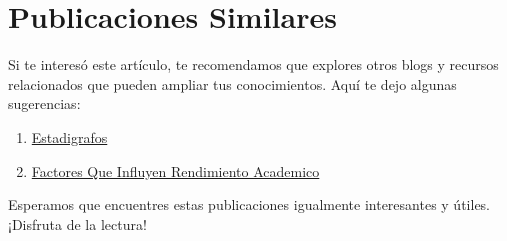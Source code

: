 \documentclass[
  jou,
  floatsintext,
  longtable,
  a4paper,
  nolmodern,
  notxfonts,
  notimes,
  12pt,
  colorlinks=true,linkcolor=blue,citecolor=blue,urlcolor=blue]{apa7}
\providecommand{\tightlist}{%
  \setlength{\itemsep}{0pt}\setlength{\parskip}{0pt}}
\begin{document}
\begin{ThreePartTable}
\end{ThreePartTable}

\section{Publicaciones Similares}\label{publicaciones-similares}

Si te interesó este artículo, te recomendamos que explores otros blogs y
recursos relacionados que pueden ampliar tus conocimientos. Aquí te dejo
algunas sugerencias:

\begin{enumerate}
\def\labelenumi{\arabic{enumi}.}
\tightlist
\item
  \href{https://epsilon-y-beta.netlify.app/estadistica/2018-05-16-estadigrafos/index.pdf}{}
  \href{https://epsilon-y-beta.netlify.app/estadistica/2018-05-16-estadigrafos}{Estadigrafos}
\item
  \href{https://epsilon-y-beta.netlify.app/estadistica/2018-12-26-factores-que-influyen-rendimiento-academico/index.pdf}{}
  \href{https://epsilon-y-beta.netlify.app/estadistica/2018-12-26-factores-que-influyen-rendimiento-academico}{Factores
  Que Influyen Rendimiento Academico}
\end{enumerate}

Esperamos que encuentres estas publicaciones igualmente interesantes y
útiles. ¡Disfruta de la lectura!
\end{document}
